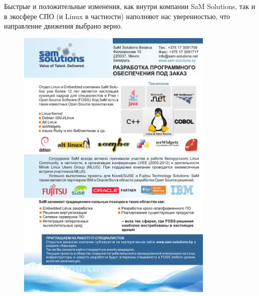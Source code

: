 \documentclass[10pt, a5paper]{article}
\begin{document}
Быстрые и положительные изменения, как внутри компании SaM Solutions, так и в экосфере СПО (и Linux в частности) наполняют нас уверенностью, что направление движения выбрано верно.

\begin{figure}[h!]
\centering
\includegraphics[height=13.4cm]{48_spons_sams.pdf}
\end{figure}
\end{document}
